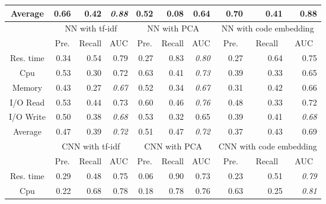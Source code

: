 \begin{table*}
\begin{tabular}{|c|r|r|r|r|r|r|r|r|r|}
Average           & 0.66  & 0.42    & \textit{0.88}            & 0.52  & 0.08    & 0.64 & 0.70  & 0.41    & 0.88 \\ \hline
\multirow{2}{*}{} & \multicolumn{3}{c|}{NN with tf-idf}        & \multicolumn{3}{c|}{NN with PCA}           & \multicolumn{3}{c|}{NN with code embedding}\\ \cline{2-10} 
                  & \multicolumn{1}{c|}{Pre.} & \multicolumn{1}{c|}{Recall} & \multicolumn{1}{c|}{AUC} & \multicolumn{1}{c|}{Pre.} & \multicolumn{1}{c|}{Recall} & \multicolumn{1}{c|}{AUC} & \multicolumn{1}{c|}{Pre.} & \multicolumn{1}{c|}{Recall} & \multicolumn{1}{c|}{AUC} \\ \hline
Res. time         & 0.34  & 0.54    & 0.79 & 0.27  & 0.83    & \textit{0.80}            & 0.27  & 0.64    & 0.75 \\ \hline
Cpu               & 0.53  & 0.30    & 0.72 & 0.63  & 0.41    & \textit{0.73}            & 0.39  & 0.33    & 0.65 \\ \hline
Memory            & 0.43  & 0.27    & \textit{0.67}            & 0.52  & 0.34    & \textit{0.67}            & 0.31  & 0.42    & 0.66 \\ \hline
I/O Read          & 0.53  & 0.44    & 0.73 & 0.60  & 0.46    & \textit{0.76}            & 0.48  & 0.33    & 0.72 \\ \hline
I/O Write         & 0.50  & 0.38    & \textit{0.68}            & 0.53  & 0.32    & 0.65 & 0.39  & 0.41    & \textit{0.68}            \\ \hline
Average           & 0.47  & 0.39    & \textit{0.72}            & 0.51  & 0.47    & \textit{0.72}            & 0.37  & 0.43    & 0.69 \\ \hline
\multirow{2}{*}{} & \multicolumn{3}{c|}{CNN with tf-idf}       & \multicolumn{3}{c|}{CNN with PCA}          & \multicolumn{3}{c|}{CNN with code embedding}                   \\ \cline{2-10} 
                  & \multicolumn{1}{c|}{Pre.} & \multicolumn{1}{c|}{Recall} & \multicolumn{1}{c|}{AUC} & \multicolumn{1}{c|}{Pre.} & \multicolumn{1}{c|}{Recall} & \multicolumn{1}{c|}{AUC} & \multicolumn{1}{c|}{Pre.} & \multicolumn{1}{c|}{Recall} & \multicolumn{1}{c|}{AUC} \\ \hline
Res. time         & 0.29  & 0.48    & 0.75 & 0.06  & 0.90    & 0.73 & 0.23  & 0.51    & \textit{0.79}            \\ \hline
Cpu               & 0.22  & 0.68    & 0.78 & 0.18  & 0.78    & 0.76 & 0.63  & 0.25    & \textit{0.81}            \\ \hline

\end{tabular}
\end{table*}
